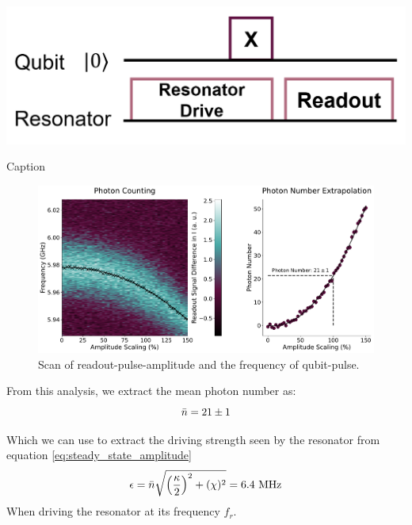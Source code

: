 \begin{marginfigure}[-4 cm]
    \centering
    \includegraphics{Figs/circuits/photon_counting.png}
    \caption{Caption}
    \label{fig:photon_counting_circuit}
\end{marginfigure}

\begin{figure}[h]
    \centering
    \includegraphics[width = \linewidth]{Calibrations/Figures/photon_number.pdf}
    \caption{Scan of readout-pulse-amplitude and the frequency of qubit-pulse.}
    \label{fig:calibration_photon_counting_scan}
\end{figure}

From this analysis, we extract the mean photon number as:
\begin{equation}
    \Bar{n} = 21 \pm 1
\end{equation}

Which we can use to extract the driving strength seen by the resonator from equation \ref{eq:steady_state_amplitude}
\begin{equation}
    \epsilon = \Bar{n} \sqrt{\left(\frac{\kappa}{2}\right)^2 + (\chi)^2} = 6.4 \text{ MHz}
\end{equation}
When driving the resonator at its frequency $f_r$.


